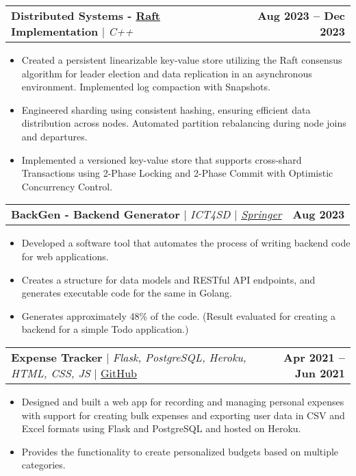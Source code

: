 \documentclass[letterpaper,11pt]{article}
\makeatletter
\newcommand{\resumeItem}[1]{
  \item\small{
    {#1 \vspace{-2pt}}
  }
}
\newcommand{\resumeProjectHeading}[2]{
    \item
    \begin{tabular*}{1.001\textwidth}{l@{\extracolsep{\fill}}r}
      \small#1 & \textbf{\small #2}\\
    \end{tabular*}\vspace{-7pt}
}
\newcommand{\resumeItemListStart}{\begin{itemize}}
\newcommand{\resumeItemListEnd}{\end{itemize}\vspace{-5pt}}
\makeatother
\begin{document}
        \resumeProjectHeading
            {\textbf{\normalsize{Distributed Systems - \href{https://raft.github.io/raft.pdf}{Raft} Implementation}} $|$ \emph{C++}}{Aug 2023 -- Dec 2023}
            \resumeItemListStart
                \resumeItem{Created a persistent linearizable key-value store utilizing the Raft consensus algorithm for leader election and data replication in an asynchronous environment. Implemented log compaction with Snapshots.}
                \resumeItem{Engineered sharding using consistent hashing, ensuring efficient data distribution across nodes. Automated partition rebalancing during node joins and departures.}
                \resumeItem{Implemented a versioned key-value store that supports cross-shard Transactions using 2-Phase Locking and 2-Phase Commit with Optimistic Concurrency Control.}
            \resumeItemListEnd
        \vspace{-17pt}

        \resumeProjectHeading
            {\textbf{\normalsize{BackGen - Backend Generator}} $|$ \emph{ICT4SD $|$ \href{https://link.springer.com/chapter/10.1007/978-981-99-6568-7_34}{Springer}}}{Aug 2023}
            \resumeItemListStart
                \resumeItem{Developed a software tool that automates the process of writing backend code for web applications.}
                \resumeItem{Creates a structure for data models and RESTful API endpoints, and generates executable code for the same in Golang.}
                \resumeItem{Generates approximately 48\% of the code. (Result evaluated for creating a backend for a simple Todo application.)}
            \resumeItemListEnd
        \vspace{-17pt}


        \resumeProjectHeading
            {\textbf{\normalsize{Expense Tracker}} $|$ \emph{Flask, PostgreSQL, Heroku, HTML, CSS, JS} $|$ \href{https://github.com/PranavDani/Expense-Tracker}{GitHub}}{Apr 2021 -- Jun 2021}
            \resumeItemListStart
                \resumeItem{Designed and built a web app for recording and managing personal expenses with support for creating bulk expenses and exporting user data in CSV and Excel formats using Flask and PostgreSQL and hosted on Heroku.}
                \resumeItem{Provides the functionality to create personalized budgets based on multiple categories.}
            \resumeItemListEnd       
        
\end{document}
